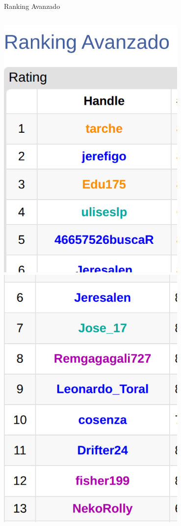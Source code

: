 \documentclass{beamer}
\begin{document}
\begin{frame}{Ranking Avanzado}
    \begin{columns}
        \centering
        \includegraphics[width=0.7\textwidth,keepaspectratio]{img/avanzado-1.png}
        \centering
        \includegraphics[width=0.7\textwidth,keepaspectratio]{img/avanzado-2.png}
    \end{columns}
\end{frame}
\end{document}
